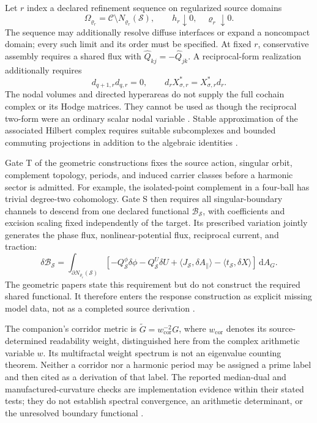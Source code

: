 \documentclass[11pt,letterpaper]{article}
\numberwithin{equation}{section}
\theoremstyle{definition}
\theoremstyle{remark}
\newcommand{\CS}{\mathcal C}
\newcommand{\dd}{\,\mathrm d}
\begin{document}
Let $r$ index a declared refinement sequence on regularized source domains
\begin{equation}
 \Omega_{\varrho_r}=\CS\setminus N_{\varrho_r}(\mathcal S),
 \qquad h_r\downarrow0,\quad\varrho_r\downarrow0.
 \label{eq:regularizedsource}
\end{equation}
The sequence may additionally resolve diffuse interfaces or expand a noncompact domain; every such limit and its order must be specified. At fixed $r$, conservative assembly requires a shared flux with $\widehat Q_{kj}=-\widehat Q_{jk}$. A reciprocal-form realization additionally requires
\begin{equation}
 d_{q+1,r}d_{q,r}=0,
 \qquad d_rX_{\sigma,r}^{*}=X_{\sigma,r}^{*}d_r.
 \label{eq:compatiblecochains}
\end{equation}
The nodal volumes and directed hyperareas do not supply the full cochain complex or its Hodge matrices. They cannot be used as though the reciprocal two-form were an ordinary scalar nodal variable \cite{tcgsconservative,tcgsfoam}. Stable approximation of the associated Hilbert complex requires suitable subcomplexes and bounded commuting projections in addition to the algebraic identities \cite{arnoldfeec}.

Gate T of the geometric constructions fixes the source action, singular orbit, complement topology, periods, and induced carrier classes before a harmonic sector is admitted. For example, the isolated-point complement in a four-ball has trivial degree-two cohomology. Gate S then requires all singular-boundary channels to descend from one declared functional $\mathcal B_{\mathcal S}$, with coefficients and excision scaling fixed independently of the target. Its prescribed variation jointly generates the phase flux, nonlinear-potential flux, reciprocal current, and traction:
\begin{equation}
 \delta\mathcal B_{\mathcal S}
 =\int_{\partial N_{\varrho_r}(\mathcal S)}
 \left[-Q^\phi_{\mathcal S}\delta\phi-Q^U_{\mathcal S}\delta U
 +\langle J_{\mathcal S},\delta A_{\parallel}\rangle
 -\langle t_{\mathcal S},\delta X\rangle\right]\dd A_G.
 \label{eq:sharedboundaryvariation}
\end{equation}
The geometric papers state this requirement but do not construct the required shared functional. It therefore enters the response construction as explicit missing model data, not as a completed source derivation \cite{tcgsconservative,tcgsfoam}.

The companion's corridor metric is $\widetilde G=w_{\mathrm{cor}}^{-2}G$, where $w_{\mathrm{cor}}$ denotes its source-determined readability weight, distinguished here from the complex arithmetic variable $w$. Its multifractal weight spectrum is not an eigenvalue counting theorem. Neither a corridor nor a harmonic period may be assigned a prime label and then cited as a derivation of that label. The reported median-dual and manufactured-curvature checks are implementation evidence within their stated tests; they do not establish spectral convergence, an arithmetic determinant, or the unresolved boundary functional \cite{tcgsconservative,tcgsfoam}.
\end{document}
